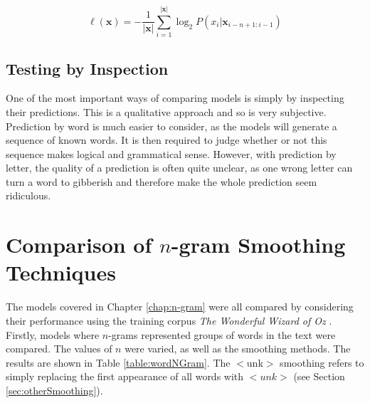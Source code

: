 \begin{equation}
\ell(\boldsymbol{x})=-\frac{1}{|\boldsymbol{x}|}\sum_{i=1}^{|\boldsymbol{x}|}\log_{2}P(x_{i}|\boldsymbol{x}_{i-n+1:i-1})
\label{eq:ellXngram}
\end{equation}

%

\subsection{Testing by Inspection}

One of the most important ways of comparing models is simply by inspecting their predictions. This is a qualitative approach and so is very subjective. Prediction by word is much easier to consider, as the models will generate a sequence of known words. It is then required to judge whether or not this sequence makes logical and grammatical sense. However, with prediction by letter, the quality of a prediction is often quite unclear, as one wrong letter can turn a word to gibberish and therefore make the whole prediction seem ridiculous.  

\section{Comparison of $n$-gram Smoothing Techniques}

The models covered in Chapter \ref{chap:n-gram} were all compared by considering their performance using the training corpus \textit{The Wonderful Wizard of Oz} \cite{baum2008wonderful}. Firstly, models where $n$-grams represented groups of words in the text were compared. The values of $n$ were varied, as well as the smoothing methods. The results are shown in Table \ref{table:wordNGram}. The $<$unk$>$ smoothing refers to simply replacing the first appearance of all words with $<unk>$ (see Section \ref{sec:otherSmoothing}).

